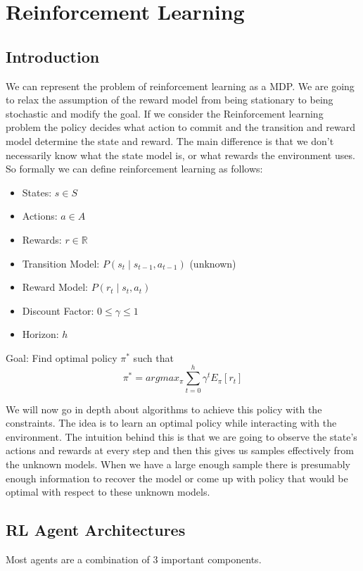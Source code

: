 \documentclass[12pt]{article}
\begin{document}
\section{Reinforcement Learning}
    \subsection{Introduction}
        We can represent the problem of reinforcement learning as a MDP. We are going to relax the assumption of the
        reward model from being stationary to being stochastic and modify the goal. If we consider the Reinforcement
        learning problem the policy decides what action to commit and the transition and reward model determine the
        state and reward. The main difference is that we don't necessarily know what the state model is, or what rewards
        the environment uses. So formally we can define reinforcement learning as follows:

        \begin{itemize}
            \item States: $s \in S$
            \item Actions: $a \in A$
            \item Rewards: $r \in \mathbb{R}$
            \item Transition Model: $P(s_t \mid s_{t-1}, a_{t-1})$ (unknown)
            \item Reward Model: $P(r_t \mid s_t, a_t)$
            \item Discount Factor: $0 \leq \gamma \leq 1$
            \item Horizon: $h$
        \end{itemize}

        Goal: Find optimal policy $\pi^*$ such that
        $$ \pi^* = argmax_{\pi} \sum_{t=0}^h \gamma^t E_{\pi}[r_t] $$

        We will now go in depth about algorithms to achieve this policy with the constraints. The idea is to learn
        an optimal policy while interacting with the environment. The intuition behind this is that we are going to
        observe the state's actions and rewards at every step and then this gives us samples effectively from the
        unknown models. When we have a large enough sample there is presumably enough information to recover the model
        or come up with policy that would be optimal with respect to these unknown models.

    \subsection{RL Agent Architectures}
        Most agents are a combination of 3 important components.
        
\end{document}
